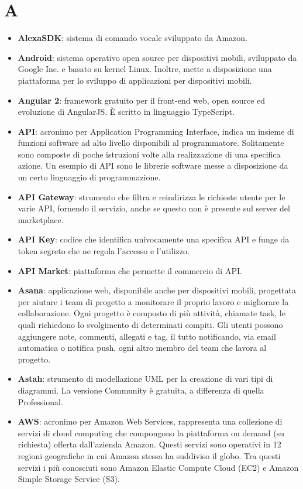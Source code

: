 \section{A}
\begin{itemize}
	\item \textbf{AlexaSDK}: sistema di comando vocale sviluppato da Amazon.
	\item \textbf{Android}: sistema operativo open source per dispositivi mobili, sviluppato da Google Inc. e basato su kernel Linux. Inoltre, mette a disposizione una piattaforma per lo sviluppo di applicazioni per dispositivi mobili.
	\item \textbf{Angular 2}: framework gratuito per il front-end web, open source ed evoluzione di AngularJS. \MakeUppercase{è} scritto in linguaggio TypeScript.
	\item \textbf{API}: acronimo per Application Programming Interface, indica un insieme di funzioni software ad alto livello disponibili al programmatore. Solitamente sono composte di poche istruzioni volte alla realizzazione di una specifica azione. Un esempio di API sono le librerie software messe a disposizione da un certo linguaggio di programmazione.
	\item \textbf{API Gateway}: strumento che filtra e reindirizza le richieste utente per le varie API, fornendo il servizio, anche se questo non è presente sul server del marketplace.
	\item \textbf{API Key}: codice che identifica univocamente una specifica API e funge da token segreto che ne regola l'accesso e l'utilizzo.
	\item \textbf{API Market}: piattaforma che permette il commercio di API.
	\item \textbf{Asana}: applicazione web, disponibile anche per dispositivi mobili, progettata per aiutare i team di progetto a monitorare il proprio lavoro e migliorare la collaborazione. Ogni progetto è composto di più attività, chiamate task, le quali richiedono lo svolgimento di determinati compiti. Gli utenti possono aggiungere note, commenti, allegati e tag, il tutto notificando, via email automatica o notifica push, ogni altro membro del team che lavora al progetto.
	\item \textbf{Astah}: strumento di modellazione UML per la creazione di vari tipi di diagrammi. La versione Community è gratuita, a differenza di quella Professional.
	\item \textbf{AWS}: acronimo per Amazon Web Services, rappresenta una collezione di servizi di cloud computing che compongono la piattaforma on demand (su richiesta) offerta dall'azienda Amazon. Questi servizi sono operativi in 12 regioni geografiche in cui Amazon stessa ha suddiviso il globo. Tra questi servizi i più conosciuti sono Amazon Elastic Compute Cloud (EC2) e Amazon Simple Storage Service (S3).

\end{itemize}
